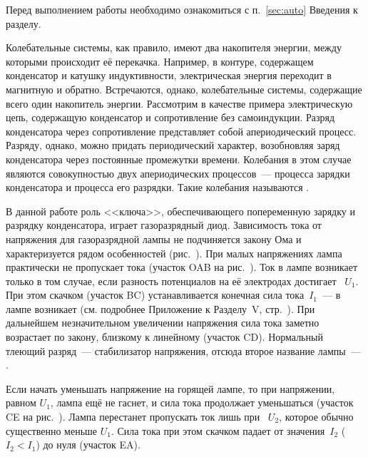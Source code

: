 


Перед выполнением работы необходимо ознакомиться с п.~\ref{sec:auto} Введения
к разделу.

Колебательные системы, как правило, имеют два накопителя энергии, между
которыми происходит её перекачка. Например, в контуре,
содержащем конденсатор и катушку индуктивности, электрическая энергия переходит
в магнитную и обратно.
Встречаются, однако, колебательные системы, содержащие всего один накопитель
энергии. Рассмотрим в качестве примера
электрическую цепь, содержащую конденсатор и сопротивление без самоиндукции.
Разряд конденсатора через сопротивление
представляет собой апериодический процесс. Разряду, однако, можно придать
периодический характер, возобновляя заряд
конденсатора через постоянные промежутки времени. Колебания в этом случае
являются совокупностью двух апериодических
процессов~--- процесса зарядки конденсатора и процесса его разрядки. Такие
колебания называются .


В данной работе роль <<ключа>>, обеспечивающего попеременную зарядку и
разрядку конденсатора, играет газоразрядный диод. 
Зависимость тока от напряжения для газоразрядной лампы не подчиняется
закону Ома и характеризуется рядом
особенностей (рис.~). При малых напряжениях лампа
практически не пропускает тока (участок OAB на рис.~).
Ток в лампе возникает только в том случае, если разность потенциалов на её
электродах достигает ~$U_1$. 
При этом скачком (участок BC) устанавливается конечная сила тока~$I_1$~--- в лампе возникает
 (см. подробнее Приложение к Разделу~V,
стр.~\pageref{sec:discharge}). 
При дальнейшем незначительном увеличении напряжения сила тока заметно возрастает 
по закону, близкому к линейному (участок CD). Нормальный тлеющий разряд~---
стабилизатор напряжения, отсюда второе название лампы~--- .


Если начать уменьшать напряжение на горящей лампе, то при напряжении, равном
$U_1$, лампа ещё не гаснет, и сила тока
продолжает уменьшаться (участок CE на рис.~). 
Лампа перестанет пропускать ток лишь при ~$U_2$, 
которое обычно
существенно меньше $U_1$. Сила тока при этом скачком падает от значения~$I_2$
($I_2<I_1$) до нуля (участок EA).

